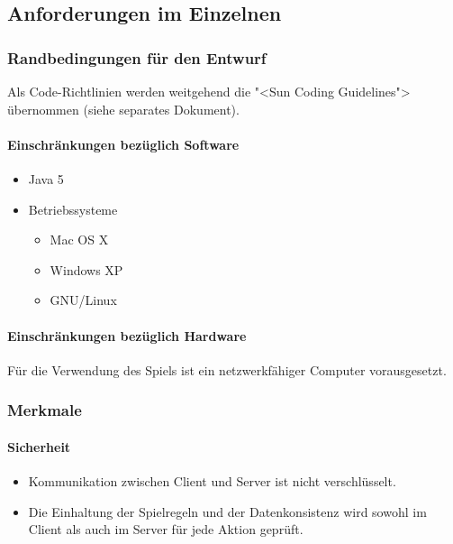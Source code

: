 \documentclass[12pt,halfparskip]{scrartcl}
\begin{document}
\subsection{Anforderungen im Einzelnen}\label{sub:anforderungen_im_einzelnen} %
\subsubsection{Randbedingungen für den Entwurf}\label{ssub:randbedingungen_für_den_entwurf} %

Als Code-Richtlinien werden weitgehend die "<Sun Coding Guidelines"> übernommen (siehe separates Dokument).

\paragraph{Einschränkungen bezüglich Software}\label{ssub:einschränkungen_bzgl_software} %
\begin{itemize}
	\item Java 5
	\item Betriebssysteme
	\begin{itemize}
		\item Mac OS X
		\item Windows XP
		\item GNU/Linux
	\end{itemize}
\end{itemize}


\paragraph{Einschränkungen bezüglich Hardware}\label{ssub:einschränkungen_bzgl_hardware} %

Für die Verwendung des Spiels ist ein netzwerkfähiger Computer vorausgesetzt.


\subsubsection{Merkmale}\label{ssub:merkmale} %
\paragraph{Sicherheit}\label{ssub:sicherheit} %
\begin{itemize}
	\item Kommunikation zwischen Client und Server ist nicht verschlüsselt.
	\item Die Einhaltung der Spielregeln und der Datenkonsistenz wird sowohl im Client als auch im Server für jede Aktion geprüft.
\end{itemize}
\end{document}
